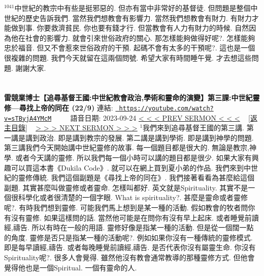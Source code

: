 \documentclass{book}
\begin{document}
$^{1041}$中世紀的教宗中有些是挺邪惡的.
但亦有當中非常好的基督徒.
但問題是整個中世紀的歷史告訴我們.
當然我們想教會有影響力.
當然我們想教會有財力.
有財力才能做到事.
你要救濟貧民.
你也要有錢才行.
但當教會有人力有財力的時候.
自然因為他在社會的影響力.
就會引來世俗政府的關心.
那怎樣能夠做得好呢?.
怎樣能夠忠於福音.
但又不會惹來世俗政府的干預.
起碼不會有太多的干預呢?.
這也是一個很複雜的問題.
我們今天就留在這兩個問號.
希望大家有時間睡午覺.
才去想這些問題.
謝謝大家.
\newpage



\section{}
\label{sec:sTByjA4YMcM}
\textbf{雷競業博士【追尋基督王國:中世紀教會政治,學術和靈命的演變】第三課:中世紀靈修—尋找上帝的同在 (22/9)}
\newline
\newline
連結: \href{https://youtube.com/watch?v=sTByjA4YMcM}{\texttt{ https://youtube.com/watch?v=sTByjA4YMcM}} ~~~~ 語音日期: 2023-09-24 
\newline
\newline
\hyperref[sec:zhKDWS7eHdY]{\small{< < < PREV SERMON < < <}}
~
\hyperref[sec:index]{\small{[返主目錄]}}
~
\hyperref[sec:cveuS8m2O7k]{\small{> > > NEXT SERMON > > >}}
\newline
\newline
$^{1}$我們來到追尋基督王國的第三講.
第一講是講到政治.
即是講到教宗的發展.
第二講是講到學術.
即是講到神學的問題.
第三講我們今天開始講中世紀靈修的故事.
每一個題目都是很大的.
無論是教宗,神學.
或者今天講的靈修.
所以我們每一個小時可以講的題目都是很少.
如果大家有興趣可以買這本書《Dukila Code》.
就可以在網上買到夏小弟的作品.
我們來到中世紀的靈修傳統.
我們這個副題是《尋找上帝的同在》.
我們接著看看為甚麼給這個副題.
其實甚麼叫做靈修或者靈命.
怎樣叫都好.
英文就是Spirituality.
其實不是一個很科學化或者很清楚的一個字眼.
What is spirituality?.
甚麼是靈命或者靈修呢?.
有時我們想到靈修.
可能我們馬上想到是某一種的活動.
假如教會的牧者問你有沒有靈修.
如果這樣問的話.
當然他可能是在問你有沒有早上起床.
或者睡覺前讀經,禱告.
所以有時在一般的用語.
靈修好像是指某一種的活動.
但是從一個闊一點的角度.
靈修是否只是指某一種的活動呢?.
例如如果你沒有一種傳統的靈修模式.
即是每早讀經,禱告.
或者每晚睡覺前讀經,禱告.
是否代表你沒有屬靈生命.
你沒有Spirituality呢?.
很多人會覺得.
雖然他沒有教會通常教導的那種靈修方式.
但他會覺得他也是一個Spiritual.
一個有靈命的人.
\end{document}
